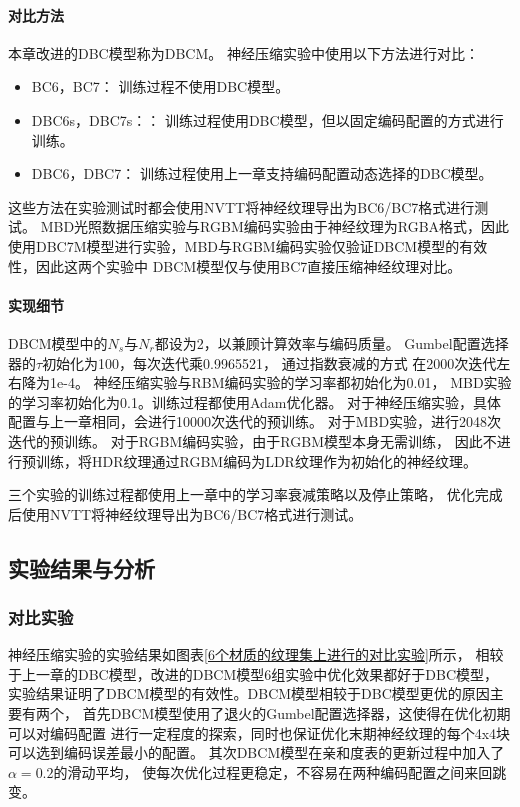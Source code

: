 \paragraph{对比方法}

本章改进的DBC模型称为DBCM。
神经压缩实验中使用以下方法进行对比：

\begin{itemize}
    \item BC6，BC7： 训练过程不使用DBC模型。
    \item DBC6s，DBC7s：： 训练过程使用DBC模型，但以固定编码配置的方式进行训练。
    \item DBC6，DBC7： 训练过程使用上一章支持编码配置动态选择的DBC模型。    
\end{itemize}

这些方法在实验测试时都会使用NVTT将神经纹理导出为BC6/BC7格式进行测试。
MBD光照数据压缩实验与RGBM编码实验由于神经纹理为RGBA格式，因此
使用DBC7M模型进行实验，MBD与RGBM编码实验仅验证DBCM模型的有效性，因此这两个实验中
DBCM模型仅与使用BC7直接压缩神经纹理对比。

\paragraph{实现细节}

DBCM模型中的$N_s$与$N_r$都设为2，以兼顾计算效率与编码质量。
Gumbel配置选择器的$\tau$初始化为100，每次迭代乘0.9965521，
通过指数衰减的方式
在2000次迭代左右降为1e-4。
神经压缩实验与RBM编码实验的学习率都初始化为0.01，
MBD实验的学习率初始化为0.1。训练过程都使用Adam优化器。
对于神经压缩实验，具体配置与上一章相同，会进行10000次迭代的预训练。
对于MBD实验，进行2048次迭代的预训练。
对于RGBM编码实验，由于RGBM模型本身无需训练，
因此不进行预训练，将HDR纹理通过RGBM编码为LDR纹理作为初始化的神经纹理。

三个实验的训练过程都使用上一章中的学习率衰减策略以及停止策略，
优化完成后使用NVTT将神经纹理导出为BC6/BC7格式进行测试。

\subsection{实验结果与分析}

\subsubsection{对比实验}
\label{4:对比实验}

神经压缩实验的实验结果如图表\ref{6个材质的纹理集上进行的对比实验}所示，
相较于上一章的DBC模型，改进的DBCM模型6组实验中优化效果都好于DBC模型，
实验结果证明了DBCM模型的有效性。DBCM模型相较于DBC模型更优的原因主要有两个，
首先DBCM模型使用了退火的Gumbel配置选择器，这使得在优化初期可以对编码配置
进行一定程度的探索，同时也保证优化末期神经纹理的每个4x4块可以选到编码误差最小的配置。
其次DBCM模型在亲和度表的更新过程中加入了$\alpha=0.2$的滑动平均，
使每次优化过程更稳定，不容易在两种编码配置之间来回跳变。


